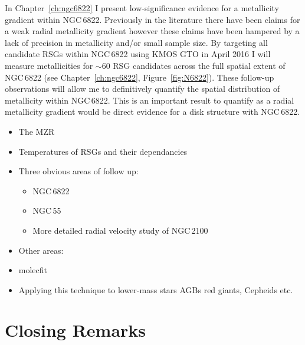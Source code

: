 In Chapter~\ref{ch:ngc6822} I present low-significance evidence for a metallicity gradient within NGC\,6822. Previously in the literature there have been claims for a weak radial metallicity gradient however these claims have been hampered by a lack of precision in metallicity and/or small sample size.
By targeting all candidate RSGs within NGC\,6822 using KMOS GTO in April 2016 I will measure metallicities for $\sim$60 RSG candidates across the full spatial extent of NGC\,6822 (see Chapter~\ref{ch:ngc6822}, Figure~\ref{fig:N6822}).
These follow-up observations will allow me to definitively quantify the spatial distribution of metallicity within NGC\,6822.
This is an important result to quantify as a radial metallicity gradient would be direct evidence for a disk structure with NGC\,6822.



\begin{itemize}
    \item The MZR
    \item Temperatures of RSGs and their dependancies
    \item Three obvious areas of follow up:
    \begin{itemize}
        \item NGC\,6822
        \item NGC\,55
        \item More detailed radial velocity study of NGC\,2100
    \end{itemize}
    \item Other areas:
    \item {\sc molecfit}
    \item Applying this technique to lower-mass stars AGBs red giants, Cepheids etc.
\end{itemize}


\section{Closing Remarks} %
\label{sec:closing_remarks}


% 
